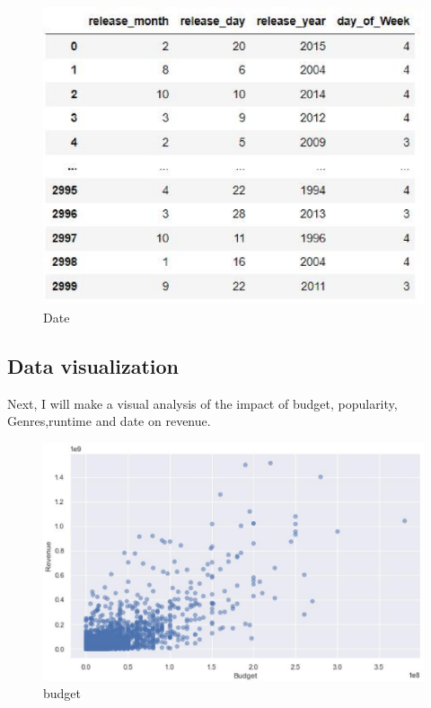 \begin{figure}[htbp]
  \includegraphics[scale=0.4]{./figures/date1.eps}
  \caption{Date}
\end{figure}



\subsection{Data visualization}
Next, I will make a visual analysis of the impact of budget, popularity, Genres,runtime and date on revenue.
 \\

\begin{figure}[htbp]
  \includegraphics[scale=0.4]{./figures/budget2.eps}
  \caption{budget}
\end{figure}

